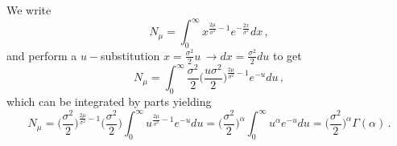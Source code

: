 \documentclass[../main.tex]{subfiles}
\begin{document}
\begin{example}[label=ex3.4]{}{}
We write
\begin{equation*}
     N_{\mu}=\int_{0}^{\infty}x^{\frac{2\mu}{\sigma^{2}}-1}e^{-\frac{2x}{\sigma^{2}}}dx\,,
\end{equation*}
and perform a $u-$substitution $x=\frac{\sigma^{2}}{2}u\,\rightarrow dx=\frac{\sigma^{2}}{2}du$ to get
\begin{equation*}
     N_{\mu}=\int_{0}^{\infty}\frac{\sigma^{2}}{2}\bigg(\frac{u\sigma^{2}}{2}\bigg)^{\frac{2\mu}{\sigma^{2}}-1}e^{-u}du\,,
\end{equation*}
which can be integrated by parts yielding
\begin{equation*}
        N_{\mu}=\bigg(\frac{\sigma^{2}}{2}\bigg)^{\frac{2\mu}{\sigma^{2}}-1}\bigg(\frac{\sigma^{2}}{2}\bigg)\int_{0}^{\infty}u^{\frac{2\mu}{\sigma^{2}}-1}e^{-u}du=\bigg(\frac{\sigma^{2}}{2}\bigg)^{\alpha}\int_{0}^{\infty}u^{\alpha}e^{-u}du = \bigg(\frac{\sigma^{2}}{2}\bigg)^{\alpha}\Gamma(\alpha)\,.
\end{equation*}
\end{example}
\end{document}
